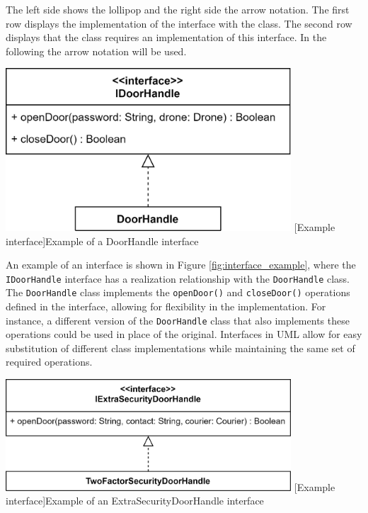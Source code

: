 \documentclass[
	12pt,
    a4paper,
    egregdoesnotlikesansseriftitles, %
    toc=chapterentrywithdots,
    oneside, openany,
    titlepage,
    parskip=half,
    headings=normal,  %
    listof=totoc,
    bibliography=totocnumbered,
    index=totoc,
    captions=tableheading,  %
    listof=flat,
    numbers=noenddot, %
    final]
    {scrbook}
\begin{document}
The left side shows the lollipop and the right side the arrow notation.
The first row displays the implementation of the interface with the class.
The second row displays that the class requires an implementation of this interface. \cite[p. 129]{uml}
In the following the arrow notation will be used.
                

\vspace{1em}
\begin{minipage}{\linewidth}
	\centering
	\includegraphics[width=0.8\textwidth]{figures/interface/doorhandle_interface.jpg}
	[Example interface]{Example of a DoorHandle interface}
	\label{fig:interface_example}
\end{minipage}
\vspace{1em}


An example of an interface is shown in Figure \ref{fig:interface_example}, where the \texttt{IDoorHandle} interface has a realization relationship with the \texttt{DoorHandle} class.
The \texttt{DoorHandle} class implements the \texttt{openDoor()} and \texttt{closeDoor()} operations defined in the interface, allowing for flexibility in the implementation.
For instance, a different version of the \texttt{DoorHandle} class that also implements these operations could be used in place of the original.
Interfaces in UML allow for easy substitution of different class implementations while maintaining the same set of required operations.


\vspace{1em}
\begin{minipage}{\linewidth}
	\centering
	\includegraphics[width=0.8\textwidth]{figures/interface/doorhandle_sec_interface.jpg}
	[Example interface]{Example of an ExtraSecurityDoorHandle interface}
	\label{fig:interface2_example}
\end{minipage}
\vspace{1em}
\end{document}
